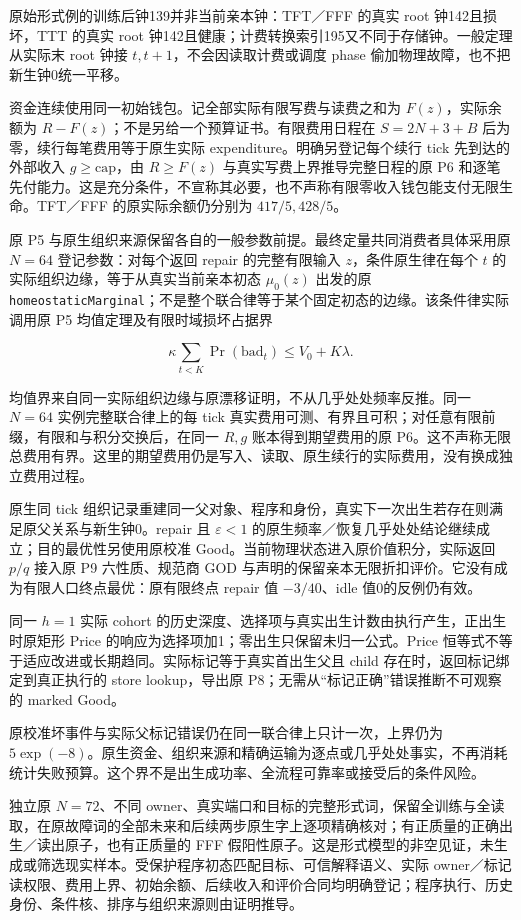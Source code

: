 \documentclass[
  11pt,
  oneside]{book}
\begin{document}
原始形式例的训练后钟139并非当前亲本钟：TFT／FFF 的真实 root 钟142且损坏，TTT 的真实 root 钟142且健康；计费转换索引195又不同于存储钟。一般定理从实际末 root 钟接 \(t,t+1\)，不会因读取计费或调度 phase 偷加物理故障，也不把新生钟0统一平移。

资金连续使用同一初始钱包。记全部实际有限写费与读费之和为 \(F(z)\)，实际余额为 \(R-F(z)\)；不是另给一个预算证书。有限费用日程在 \(S=2N+3+B\) 后为零，续行每笔费用等于原生实际 expenditure。明确另登记每个续行 tick 先到达的外部收入 \(g\ge\mathrm{cap}\)，由 \(R\ge F(z)\) 与真实写费上界推导完整日程的原 P6 和逐笔先付能力。这是充分条件，不宣称其必要，也不声称有限零收入钱包能支付无限生命。TFT／FFF 的原实际余额仍分别为 \(417/5,428/5\)。

原 P5 与原生组织来源保留各自的一般参数前提。最终定量共同消费者具体采用原 \(N=64\) 登记参数：对每个返回 repair 的完整有限输入 \(z\)，条件原生律在每个 \(t\) 的实际组织边缘，等于从真实当前亲本初态 \(\mu_0(z)\) 出发的原 \nolinkurl{homeostaticMarginal}；不是整个联合律等于某个固定初态的边缘。该条件律实际调用原 P5 均值定理及有限时域损坏占据界

\[\kappa\sum_{t<K}\Pr(\mathrm{bad}_t)
\le V_0+K\lambda.\]

均值界来自同一实际组织边缘与原漂移证明，不从几乎处处频率反推。同一 \(N=64\) 实例完整联合律上的每 tick 真实费用可测、有界且可积；对任意有限前缀，有限和与积分交换后，在同一 \(R,g\) 账本得到期望费用的原 P6。这不声称无限总费用有界。这里的期望费用仍是写入、读取、原生续行的实际费用，没有换成独立费用过程。

原生同 tick 组织记录重建同一父对象、程序和身份，真实下一次出生若存在则满足原父关系与新生钟0。repair 且 \(\varepsilon<1\) 的原生频率／恢复几乎处处结论继续成立；目的最优性另使用原校准 Good。当前物理状态进入原价值积分，实际返回 \(p/q\) 接入原 P9 六性质、规范商 GOD 与声明的保留亲本无限折扣评价。它没有成为有限人口终点最优：原有限终点 repair 值 \(-3/40\)、idle 值0的反例仍有效。

同一 \(h=1\) 实际 cohort 的历史深度、选择项与真实出生计数由执行产生，正出生时原矩形 Price 的响应为选择项加1；零出生只保留未归一公式。Price 恒等式不等于适应改进或长期趋同。实际标记等于真实首出生父且 child 存在时，返回标记绑定到真正执行的 store lookup，导出原 P8；无需从``标记正确''错误推断不可观察的 marked Good。

原校准坏事件与实际父标记错误仍在同一联合律上只计一次，上界仍为 \(5\exp(-8)\)。原生资金、组织来源和精确运输为逐点或几乎处处事实，不再消耗统计失败预算。这个界不是出生成功率、全流程可靠率或接受后的条件风险。

独立原 \(N=72\)、不同 owner、真实端口和目标的完整形式词，保留全训练与全读取，在原故障词的全部未来和后续两步原生字上逐项精确核对；有正质量的正确出生／读出原子，也有正质量的 FFF 假阳性原子。这是形式模型的非空见证，未生成或筛选现实样本。受保护程序初态匹配目标、可信解释语义、实际 owner／标记读权限、费用上界、初始余额、后续收入和评价合同均明确登记；程序执行、历史身份、条件核、排序与组织来源则由证明推导。
\end{document}
